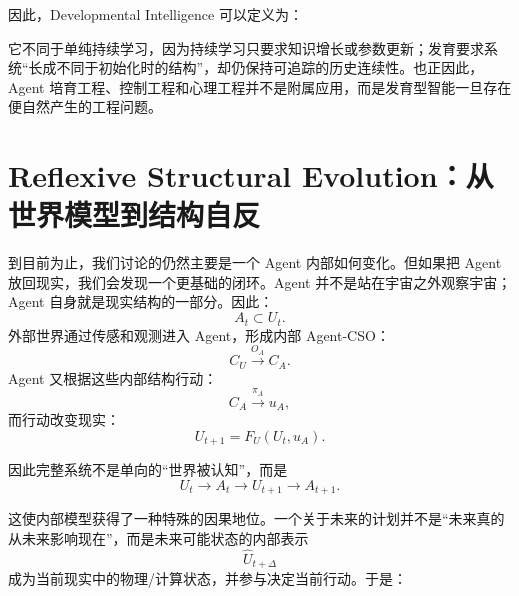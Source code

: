 因此，Developmental Intelligence 可以定义为：

\begin{statementbox}
\centering
{}
\end{statementbox}

它不同于单纯持续学习，因为持续学习只要求知识增长或参数更新；发育要求系统“长成不同于初始化时的结构”，却仍保持可追踪的历史连续性。也正因此，Agent 培育工程、控制工程和心理工程并不是附属应用，而是发育型智能一旦存在便自然产生的工程问题。

\section{Reflexive Structural Evolution：从世界模型到结构自反}

到目前为止，我们讨论的仍然主要是一个 Agent 内部如何变化。但如果把 Agent 放回现实，我们会发现一个更基础的闭环。Agent 并不是站在宇宙之外观察宇宙；Agent 自身就是现实结构的一部分。因此：
\begin{equation}
A_t\subset U_t.
\end{equation}
外部世界通过传感和观测进入 Agent，形成内部 Agent-CSO：
\begin{equation}
C_U
\xrightarrow{O_A}
C_A.
\end{equation}
Agent 又根据这些内部结构行动：
\begin{equation}
C_A
\xrightarrow{\pi_A}
u_A,
\end{equation}
而行动改变现实：
\begin{equation}
U_{t+1}
=
F_U
\left(
U_t,u_A
\right).
\end{equation}

因此完整系统不是单向的“世界被认知”，而是
\begin{equation}
\boxed{
U_t
\rightarrow
A_t
\rightarrow
U_{t+1}
\rightarrow
A_{t+1}.
}
\end{equation}

这使内部模型获得了一种特殊的因果地位。一个关于未来的计划并不是“未来真的从未来影响现在”，而是未来可能状态的内部表示
\begin{equation}
\widehat{U}_{t+\Delta}
\end{equation}
成为当前现实中的物理/计算状态，并参与决定当前行动。于是：
\begin{statementbox}
\centering
{}
\end{statementbox}

